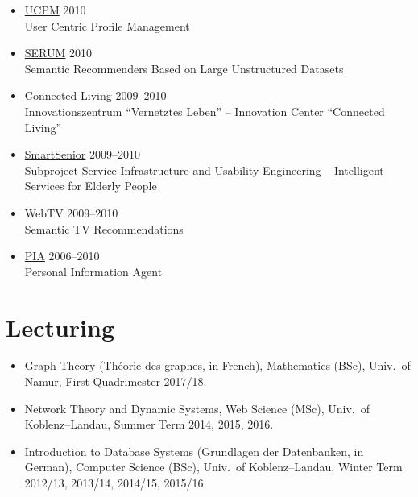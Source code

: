 \documentclass[line,mm]{res}
\newcounter{y}
\begin{document}
\begin{resume}
\begin{itemize}
\item \href{http://www.dai-labor.de/en/irml/ucpm/}{UCPM} \hfill 2010 \\
  User Centric Profile Management
\item \href{http://www.dai-labor.de/en/irml/serum/}{SERUM} \hfill 2010 \\
  Semantic Recommenders Based on Large Unstructured Datasets
\item \href{http://www.connected-living.org/}{Connected Living} \hfill 2009--2010 \\
   Innovationszentrum ``Vernetztes Leben'' -- Innovation Center ``Connected Living''
\item \href{http://www1.smart-senior.de/}{SmartSenior} \hfill 2009--2010 \\
  Subproject Service Infrastructure and Usability Engineering -- Intelligent Services for Elderly People
\item WebTV \hfill 2009--2010 \\
  Semantic TV Recommendations
\item \href{http://pia-services.de/}{PIA} \hfill 2006--2010 \\
  Personal Information Agent 
\end{itemize}

\section{Lecturing}
\begin{itemize}
\item Graph Theory (Théorie des graphes, in French), Mathematics (BSc),
  Univ.\ of Namur, First Quadrimester 2017/18.   
\item Network Theory and Dynamic Systems, Web Science (MSc), Univ.\ of
  Koblenz--Landau, Summer Term 2014, 2015, 2016.   
\item Introduction to Database Systems (Grundlagen der Datenbanken, in
  German), Computer Science (BSc), Univ.\ of Koblenz--Landau, 
  Winter Term 2012/13, 2013/14, 2014/15, 2015/16.
\end{itemize}


\end{resume}
\end{document}
